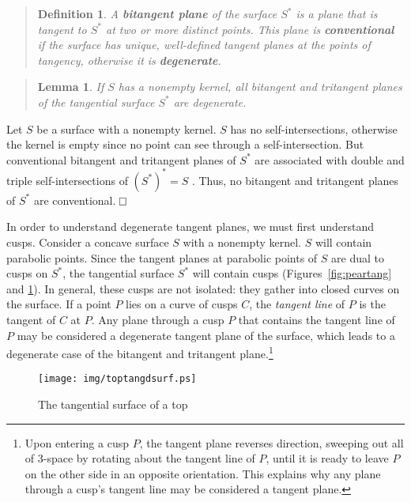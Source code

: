 \documentclass[twoside]{article}
\newtheorem{definitionenv}{Definition}
\newenvironment{defn2}{\begin{quote}\begin{definitionenv}}%
                           {\end{definitionenv}\end{quote}}
\newtheorem{lemmaenv}{Lemma}
\newenvironment{lemma}{\begin{quote}\begin{lemmaenv}}%
                           {\end{lemmaenv}\end{quote}}
\newcommand{\prf}{\noindent{{\bf Proof}:\ \ \ }}
\def\qed{\hbox{${\vcenter{\vbox{			%
   \hrule height 0.4pt\hbox{\vrule width 0.4pt height 6pt
   \kern5pt\vrule width 0.4pt}\hrule height 0.4pt}}}$}}
\begin{document}
\begin{defn2}
A {\bf bitangent plane} of the surface $S^*$ is a plane that
is tangent to $S^*$ at two or more distinct points.
This plane is {\bf conventional} if the surface has unique, well-defined 
tangent planes at the points of tangency,
otherwise it is {\bf degenerate}.
\end{defn2}

\begin{lemma}
If $S$ has a nonempty kernel, all bitangent and tritangent planes 
of the tangential surface $S^*$ are degenerate.
\end{lemma}
\prf
Let $S$ be a surface with a nonempty kernel.
$S$ has no self-intersections, otherwise the kernel is empty
since no point can see through a self-intersection.
But conventional bitangent and tritangent planes of $S^*$ are associated
with double and triple self-intersections of $(S^*)^* = S$ \cite{8}.
Thus, no bitangent and tritangent planes of $S^*$ are conventional.
\qed\,

\smallskip

In order to understand degenerate tangent planes, we must first understand cusps.
Consider a concave
surface $S$ with a nonempty kernel.
$S$ will contain parabolic points.
Since the tangent planes at parabolic points of $S$ are dual to cusps on $S^*$,
the tangential surface $S^*$ will contain cusps 
(Figures~\ref{fig:peartang} and \ref{fig:toptangdsurf}).
In general, these cusps are not isolated: they gather into closed curves on the surface.
If a point $P$ lies on a curve of cusps $C$,
the {\em tangent line} of $P$ is the tangent of $C$ at $P$.
Any plane through a cusp $P$ that contains the tangent line of $P$ may be considered
a degenerate tangent plane of the surface,
which leads to a degenerate case of the bitangent and tritangent plane.\footnote{Upon entering a cusp $P$, 
	the tangent plane reverses direction, sweeping out all of 3-space 
	by rotating about the tangent line of $P$,
	until it is ready to leave $P$ on the other side in an opposite orientation.
        This explains why any plane through a cusp's tangent line may be considered a tangent plane.}



\begin{figure}[htbp]
\vspace*{14pt}
\begin{center}
\texttt{[image: img/toptangdsurf.ps]}
\end{center}
\caption{The tangential surface of a top}
\label{fig:toptangdsurf}
\end{figure}
\end{document}
